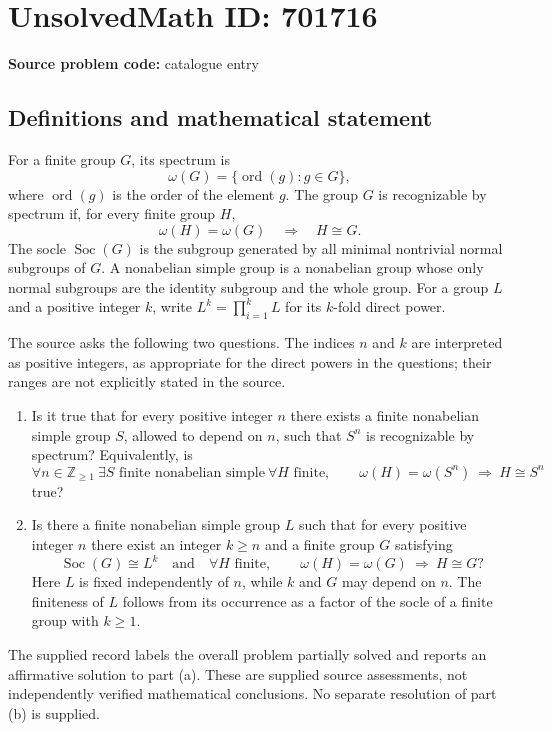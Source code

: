 \documentclass[11pt]{article}
\newcommand{\Z}{\mathbb{Z}}
\begin{document}
\section*{UnsolvedMath ID: 701716}
\textbf{Source problem code:} catalogue entry
\subsection{Definitions and mathematical statement}
For a finite group \(G\), its spectrum is
\[
\omega(G)=\{\operatorname{ord}(g):g\in G\},
\]
where \(\operatorname{ord}(g)\) is the order of the element \(g\). The group \(G\) is recognizable by spectrum if, for every finite group \(H\),
\[
\omega(H)=\omega(G)\quad\Longrightarrow\quad H\cong G.
\]
The socle \(\operatorname{Soc}(G)\) is the subgroup generated by all minimal nontrivial normal subgroups of \(G\). A nonabelian simple group is a nonabelian group whose only normal subgroups are the identity subgroup and the whole group. For a group \(L\) and a positive integer \(k\), write \(L^k=\prod_{i=1}^{k}L\) for its \(k\)-fold direct power.

The source asks the following two questions. The indices \(n\) and \(k\) are interpreted as positive integers, as appropriate for the direct powers in the questions; their ranges are not explicitly stated in the source.
\begin{enumerate}
\item[(a)] Is it true that for every positive integer \(n\) there exists a finite nonabelian simple group \(S\), allowed to depend on \(n\), such that \(S^n\) is recognizable by spectrum? Equivalently, is
\[
\forall n\in\Z_{\geq 1}\ \exists S\text{ finite nonabelian simple}\ \forall H\text{ finite},\qquad
\omega(H)=\omega(S^n)\ \Longrightarrow\ H\cong S^n
\]
true?
\item[(b)] Is there a finite nonabelian simple group \(L\) such that for every positive integer \(n\) there exist an integer \(k\geq n\) and a finite group \(G\) satisfying
\[
\operatorname{Soc}(G)\cong L^k
\quad\text{and}\quad
\forall H\text{ finite},\qquad
\omega(H)=\omega(G)\ \Longrightarrow\ H\cong G?
\]
Here \(L\) is fixed independently of \(n\), while \(k\) and \(G\) may depend on \(n\). The finiteness of \(L\) follows from its occurrence as a factor of the socle of a finite group with \(k\geq1\).
\end{enumerate}
The supplied record labels the overall problem partially solved and reports an affirmative solution to part (a). These are supplied source assessments, not independently verified mathematical conclusions. No separate resolution of part (b) is supplied.
\end{document}
